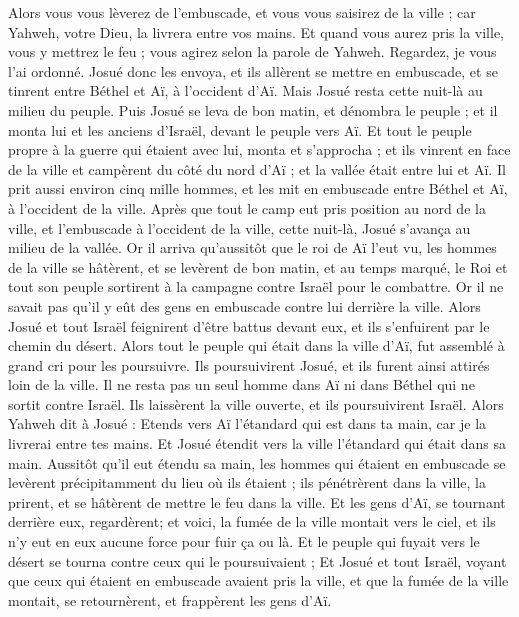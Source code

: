\begin{multicols}{2}
Alors vous vous lèverez de l'embuscade, et vous vous saisirez de la ville ; car Yahweh, votre Dieu, la livrera entre vos mains.
Et quand vous aurez pris la ville, vous y mettrez le feu ; vous agirez selon la parole de Yahweh. Regardez, je vous l'ai ordonné.
Josué donc les envoya, et ils allèrent se mettre en embuscade, et se tinrent entre Béthel et Aï, à l'occident d'Aï. Mais Josué resta cette nuit-là au milieu du peuple.
Puis Josué se leva de bon matin, et dénombra le peuple ; et il monta lui et les anciens d'Israël, devant le peuple vers Aï.
Et tout le peuple propre à la guerre qui étaient avec lui, monta et s'approcha ; et ils vinrent en face de la ville et campèrent du côté du nord d'Aï ; et la vallée était entre lui et Aï.
Il prit aussi environ cinq mille hommes, et les mit en embuscade entre Béthel et Aï, à l'occident de la ville.
Après que tout le camp eut pris position au nord de la ville, et l'embuscade à l'occident de la ville, cette nuit-là, Josué s'avança au milieu de la vallée.
Or il arriva qu'aussitôt que le roi de Aï l'eut vu, les hommes de la ville se hâtèrent, et se levèrent de bon matin, et au temps marqué, le Roi et tout son peuple sortirent à la campagne contre Israël pour le combattre. Or il ne savait pas qu'il y eût des gens en embuscade contre lui derrière la ville.
Alors Josué et tout Israël feignirent d'être battus devant eux, et ils s'enfuirent par le chemin du désert.
Alors tout le peuple qui était dans la ville d'Aï, fut assemblé à grand cri pour les poursuivre. Ils poursuivirent Josué, et ils furent ainsi attirés loin de la ville.
Il ne resta pas un seul homme dans Aï ni dans Béthel qui ne sortit contre Israël. Ils laissèrent la ville ouverte, et ils poursuivirent Israël.
Alors Yahweh dit à Josué : Etends vers Aï l'étandard qui est dans ta main, car je la livrerai entre tes mains. Et Josué étendit vers la ville l'étandard qui était dans sa main.
Aussitôt qu'il eut étendu sa main, les hommes qui étaient en embuscade se levèrent précipitamment du lieu où ils étaient ; ils pénétrèrent dans la ville, la prirent, et se hâtèrent de mettre le feu dans la ville.
Et les gens d'Aï, se tournant derrière eux, regardèrent; et voici, la fumée de la ville montait vers le ciel, et ils n'y eut en eux aucune force pour fuir ça ou là. Et le peuple qui fuyait vers le désert se tourna contre ceux qui le poursuivaient ;
Et Josué et tout Israël, voyant que ceux qui étaient en embuscade avaient pris la ville, et que la fumée de la ville montait, se retournèrent, et frappèrent les gens d'Aï.

\end{multicols}

